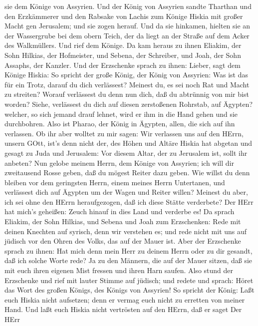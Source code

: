 sie dem Könige von Assyrien.  Und der König von Assyrien
sandte Tharthan und den Erzkämmerer und den Rabsake von Lachis zum
Könige Hiskia mit großer Macht gen Jerusalem; und sie zogen herauf. Und
da sie hinkamen, hielten sie an der Wassergrube bei dem obern Teich, der
da liegt an der Straße auf dem Acker des Walkmüllers.  Und
rief dem Könige. Da kam heraus zu ihnen Eliakim, der Sohn Hilkias, der
Hofmeister, und Sebena, der Schreiber, und Joah, der Sohn Assaphs, der
Kanzler.  Und der Erzschenke sprach zu ihnen: Lieber, sagt
dem Könige Hiskia: So spricht der große König, der König von Assyrien:
Was ist das für ein Trotz, darauf du dich verlässest? 
Meinest du, es sei noch Rat und Macht zu streiten? Worauf verlässest du
denn nun dich, daß du abtrünnig von mir bist worden? 
Siehe, verlässest du dich auf diesen zerstoßenen Rohrstab, auf Ägypten?
welcher, so sich jemand drauf lehnet, wird er ihm in die Hand gehen und
sie durchbohren. Also ist Pharao, der König in Ägypten, allen, die sich
auf ihn verlassen.  Ob ihr aber wolltet zu mir sagen: Wir
verlassen uns auf den HErrn, unsern GOtt, ist's denn nicht der, des
Höhen und Altäre Hiskia hat abgetan und gesagt zu Juda und Jerusalem:
Vor diesem Altar, der zu Jerusalem ist, sollt ihr anbeten? 
Nun gelobe meinem Herrn, dem Könige von Assyrien; ich will dir
zweitausend Rosse geben, daß du mögest Reiter dazu geben. 
Wie willst du denn bleiben vor dem geringsten Herrn, einem meines Herrn
Untertanen, und verlässest dich auf Ägypten um der Wagen und Reiter
willen?  Meinest du aber, ich sei ohne den HErrn
heraufgezogen, daß ich diese Stätte verderbete? Der HErr hat mich's
geheißen: Zeuch hinauf in dies Land und verderbe es!  Da
sprach Eliakim, der Sohn Hilkias, und Sebena und Joah zum Erzschenken:
Rede mit deinen Knechten auf syrisch, denn wir verstehen es; und rede
nicht mit uns auf jüdisch vor den Ohren des Volks, das auf der Mauer
ist.  Aber der Erzschenke sprach zu ihnen: Hat mich denn
mein Herr zu deinem Herrn oder zu dir gesandt, daß ich solche Worte
rede? Ja zu den Männern, die auf der Mauer sitzen, daß sie mit euch
ihren eigenen Mist fressen und ihren Harn saufen.  Also
stund der Erzschenke und rief mit lauter Stimme auf jüdisch; und redete
und sprach: Höret das Wort des großen Königs, des Königs von Assyrien!
 So spricht der König: Laßt euch Hiskia nicht aufsetzen;
denn er vermag euch nicht zu erretten von meiner Hand.  Und
laßt euch Hiskia nicht vertrösten auf den HErrn, daß er saget Der HErr
